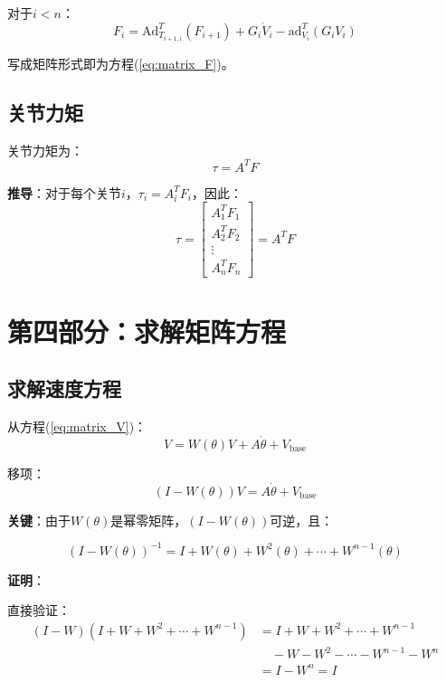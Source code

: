 \documentclass[12pt,a4paper]{article}
\begin{document}
对于$i < n$：
\begin{equation}
F_i = \text{Ad}_{T_{i+1,i}}^T(F_{i+1}) + G_i \dot{V}_i - \text{ad}_{V_i}^T(G_i V_i)
\end{equation}

写成矩阵形式即为方程(\ref{eq:matrix_F})。

\subsection{关节力矩}

关节力矩为：
\begin{equation}
\tau = A^T F
\label{eq:matrix_tau}
\end{equation}

\textbf{推导}：对于每个关节$i$，$\tau_i = A_i^T F_i$，因此：
\begin{equation}
\tau = \begin{bmatrix} A_1^T F_1 \\ A_2^T F_2 \\ \vdots \\ A_n^T F_n \end{bmatrix} = A^T F
\end{equation}

\section{第四部分：求解矩阵方程}

\subsection{求解速度方程}

从方程(\ref{eq:matrix_V})：
\begin{equation}
V = W(\theta)V + A\dot{\theta} + V_{\text{base}}
\end{equation}

移项：
\begin{equation}
(I - W(\theta))V = A\dot{\theta} + V_{\text{base}}
\end{equation}

\textbf{关键}：由于$W(\theta)$是幂零矩阵，$(I - W(\theta))$可逆，且：

\begin{equation}
(I - W(\theta))^{-1} = I + W(\theta) + W^2(\theta) + \cdots + W^{n-1}(\theta)
\label{eq:inverse_I_minus_W}
\end{equation}

\textbf{证明}：

直接验证：
\begin{align}
(I - W)(I + W + W^2 + \cdots + W^{n-1}) &= I + W + W^2 + \cdots + W^{n-1} \\
&\quad - W - W^2 - \cdots - W^{n-1} - W^n \\
&= I - W^n = I
\end{align}
\end{document}
